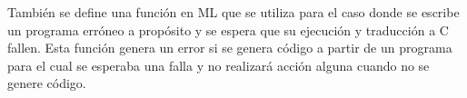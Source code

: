 \begin{comment}
\begin{lstlisting}
  fun export_c_code (SOME code) rel_path name thy =
    let
      val str = code |> String.implode;
    in
      if rel_path="" orelse name="" then
        (writeln str; thy)
      else let
        val base_path = Resources.master_directory thy
        val rel_path = Path.explode rel_path
        val name_path = Path.basic name |> Path.ext "c"

        val abs_path = Path.appends [base_path, rel_path, name_path]
        val abs_path = Path.implode abs_path

        val _ = writeln ("Writing to file " ^ abs_path)

        val os = TextIO.openOut abs_path;
        val _ = TextIO.output (os, str);
        val _ = TextIO.flushOut os;
        val _ = TextIO.closeOut os;
        in thy end
      end
  | export_c_code NONE _ _ thy =
      (error "Invalid program, no code is generated."; thy)
\end{lstlisting}

Esta función toma cuatro parámetros.
El primer parámetro de la función \verb|export_c_code| es un \verb|string option| esto corresponde a la representación en cadena de caracteres del código C generado por el programa.
Si recibe un valor \verb|None| significa que la función \verb|prepare_export| falló y no se debe generar un programa en C.
El segundo parámetro es la ruta al directorio al cual se quiere exportar el programa, este parámetro es una ruta relativa al directorio donde se encuentra la teoría de Isabelle que contiene las directivas para hacer \textit{pretty printing}.
El tercer parámetro es el nombre del programa.
El último parámetro es el contexto de la teoría actual.

Si la ruta dada es una cadena vacía el código generado se imprimirá a la vista de salida de Isabelle.
Esta función crea un nuevo archivo con el nombre indicado en los parámetros con ``\verb|.c|'' agregado al final (es decir, $<nombre>\mathtt{.c}$) en el directorio indicado por el parámetro de la ruta.
El usuario puede entonces encontrar el código generado en el directorio indicado.
\end{comment}

También se define una función en ML que se utiliza para el caso donde se escribe un programa erróneo a propósito y se espera que su ejecución y traducción a C fallen.
Esta función genera un error si se genera código a partir de un programa para el cual se esperaba una falla y no realizará acción alguna cuando no se genere código.

\begin{comment}
\begin{lstlisting}
fun expect_failed_export (SOME _) = error ``Expected failed export''
  | expect_failed_export NONE = ()
\end{lstlisting}

La función \verb|expect_failed_export| genera un error en Isabelle si se genera código a partir del programa para el cual se esperaba una falla y no realizará acción alguna cuando no se genere código.
Tener este tipo de función será útil más adelante para la realización de pruebas.
\end{comment}
